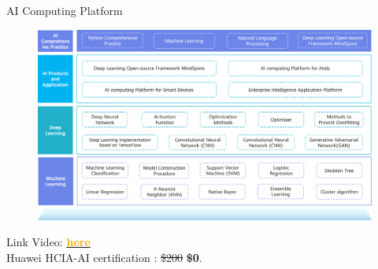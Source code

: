 \documentclass[pdf]{beamer}
\theoremstyle{mystyle}
\begin{document}
%
%
%	

\begin{frame}{AI Computing Platform}
	\begin{figure}[!ht]
		\centering
		\includegraphics[scale=.18]{images/peta-topik-huawei-ai}
	\end{figure}				
	Link Video: \href{https://drive.google.com/file/d/1e94HC381qGUsyLEfsxpE5o4btTd59HWZ/view?usp=sharing}{\textcolor{orange}{\textbf{here}}} \\
	Huawei HCIA-AI certification : \st{\$200} \textbf{\$0}.	
\end{frame}
\end{document}
